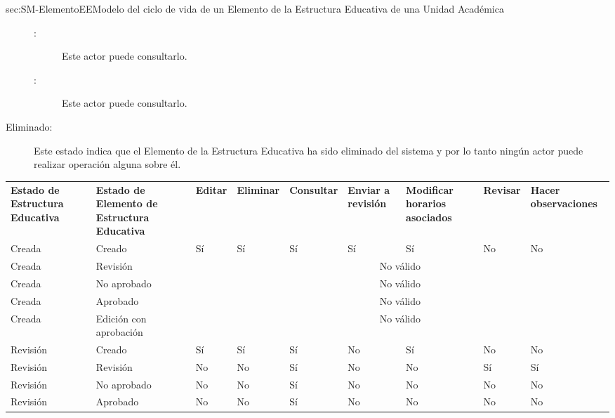 \begin{Maquina}{sec:SM-ElementoEE}{Modelo del ciclo de vida de un Elemento de la Estructura Educativa de una Unidad Académica}
\begin{description}
\begin{description}
		\item[:] Este actor puede consultarlo.
		
		\item[:] Este actor puede consultarlo.

	\end{description}

\item[Eliminado:] Este estado indica que el Elemento de la Estructura Educativa ha sido eliminado del sistema y por lo tanto ningún actor puede realizar operación alguna sobre él.

\end{description}

\begin{longtable}{| p{} | p{} | p{}| p{}| p{}| p{}| p{}| p{}| p{}| }
	\hline  
	\rowcolor{colorPrincipal}
	\multicolumn{9}{|c|}{\bf\color{white}{Tabla de Estados}}\\\hline
	\label{SM:combinatoriaEstados} 
	{\bf Estado de Estructura Educativa} & {\bf Estado de Elemento de Estructura Educativa} & {\bf Editar} & {\bf Eliminar} & {\bf Consultar} & {\bf Enviar a revisión}  & {\bf Modificar horarios asociados} & {\bf Revisar} & {\bf Hacer observaciones}\\
	\endfirsthead
	\hline
	Creada & Creado & Sí & Sí & Sí & Sí  & Sí & No & No\\
	\hline
	Creada & Revisión & \multicolumn{7}{c|}{No válido}\\
	\hline
	Creada & No aprobado & \multicolumn{7}{c|}{No válido}\\
	\hline
	Creada & Aprobado & \multicolumn{7}{c|}{No válido}\\
	\hline
	Creada & Edición con aprobación & \multicolumn{7}{c|}{No válido}\\
	\hline
	Revisión & Creado & Sí & Sí & Sí & No & Sí & No & No\\
	\hline
	Revisión & Revisión & No & No & Sí & No & No & Sí & Sí\\
	\hline
	Revisión & No aprobado & No & No & Sí & No & No & No & No\\
	\hline
	Revisión & Aprobado & No & No & Sí & No & No & No & No\\

\end{longtable}
\end{Maquina}

